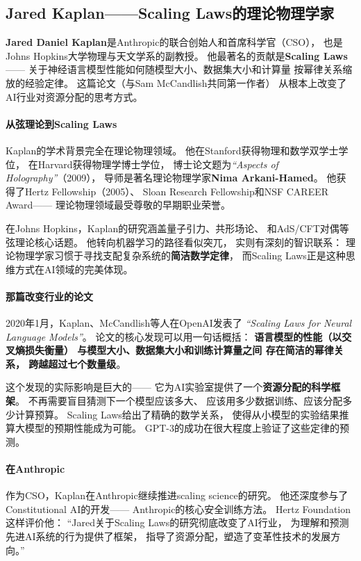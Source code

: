 \subsection{Jared Kaplan——Scaling Laws的理论物理学家}
\label{subsec:kaplan}

\textbf{Jared Daniel Kaplan}是Anthropic的联合创始人和首席科学官（CSO），
也是Johns Hopkins大学物理与天文学系的副教授。
他最著名的贡献是\textbf{Scaling Laws}——
关于神经语言模型性能如何随模型大小、数据集大小和计算量
按幂律关系缩放的经验定律。
这篇论文（与Sam McCandlish共同第一作者）
从根本上改变了AI行业对资源分配的思考方式。

\paragraph{从弦理论到Scaling Laws}
Kaplan的学术背景完全在理论物理领域。
他在Stanford获得物理和数学双学士学位，
在Harvard获得物理学博士学位，
博士论文题为\textit{``Aspects of Holography''}（2009），
导师是著名理论物理学家\textbf{Nima Arkani-Hamed}。
他获得了Hertz Fellowship（2005）、
Sloan Research Fellowship和NSF CAREER Award——
理论物理领域最受尊敬的早期职业荣誉。

在Johns Hopkins，Kaplan的研究涵盖量子引力、共形场论、
和AdS/CFT对偶等弦理论核心话题。
他转向机器学习的路径看似突兀，
实则有深刻的智识联系：
理论物理学家习惯于寻找支配复杂系统的\textbf{简洁数学定律}，
而Scaling Laws正是这种思维方式在AI领域的完美体现。

\paragraph{那篇改变行业的论文}
2020年1月，Kaplan、McCandlish等人在OpenAI发表了
\textit{``Scaling Laws for Neural Language Models''}。
论文的核心发现可以用一句话概括：
\textbf{语言模型的性能（以交叉熵损失衡量）
与模型大小、数据集大小和训练计算量之间
存在简洁的幂律关系，
跨越超过七个数量级}。

这个发现的实际影响是巨大的——
它为AI实验室提供了一个\textbf{资源分配的科学框架}。
不再需要盲目猜测下一个模型应该多大、
应该用多少数据训练、应该分配多少计算预算。
Scaling Laws给出了精确的数学关系，
使得从小模型的实验结果推算大模型的预期性能成为可能。
GPT-3的成功在很大程度上验证了这些定律的预测。

\paragraph{在Anthropic}
作为CSO，Kaplan在Anthropic继续推进scaling science的研究。
他还深度参与了Constitutional AI的开发——
Anthropic的核心安全训练方法。
Hertz Foundation这样评价他：
``Jared关于Scaling Laws的研究彻底改变了AI行业，
为理解和预测先进AI系统的行为提供了框架，
指导了资源分配，塑造了变革性技术的发展方向。''

